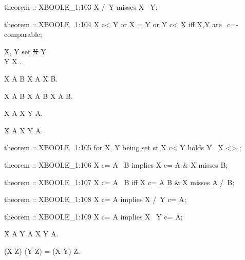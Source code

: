 \begin{paracol}{2}
\switchcolumn

\begin{mizar}
theorem :: XBOOLE_1:103
  X /\ Y misses X \+\ Y;

theorem :: XBOOLE_1:104
  X c< Y or X = Y or Y c< X
  iff X,Y are_c=-comparable;
\end{mizar}

\switchcolumn*\ensurevspace{5cm}

\begin{theorem+}
  \forall X, Y \being \mbox{set} \st X \propersubset Y\\
  \holds Y \setminus X \neq \emptyset.
\end{theorem+}

\begin{theorem}
  X \subset A \setminus B \implies X \subset A \land X \misses B.
\end{theorem}

\begin{theorem}
  X \subset A \dotminus B \iff X \subset A \cup B \land X \misses A \cap B.
\end{theorem}

\begin{theorem}
  X \subset A \implies X \cap Y \subset A.
\end{theorem}

\begin{theorem}
  X \subset A \implies X \setminus Y \subset A.
\end{theorem}

\switchcolumn

\begin{mizar}
theorem :: XBOOLE_1:105
  for X, Y being set st X c< Y
  holds Y \ X <> {};

theorem :: XBOOLE_1:106
  X c= A \ B implies X c= A & X misses B;

theorem :: XBOOLE_1:107
  X c= A \+\ B iff
  X c= A \/ B & X misses A /\ B;

theorem :: XBOOLE_1:108
  X c= A implies X /\ Y c= A;

theorem :: XBOOLE_1:109
  X c= A implies X \ Y c= A;
\end{mizar}

\switchcolumn*\ensurevspace{5cm}

\begin{theorem}
  X \subset A \land Y \subset A \implies X \dotminus Y \subset A.
\end{theorem}

\begin{theorem}
  (X \cap Z) \setminus (Y \cap Z) = (X \setminus Y) \cap Z.
\end{theorem}


\end{paracol}
